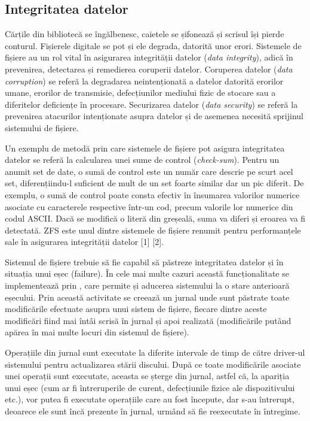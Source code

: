\subsection{Integritatea datelor}
\label{sec:file-system-fs-integrity}

Cărțile din bibliotecă se îngălbenesc, caietele se șifonează și scrisul își
pierde conturul. Fișierele digitale se pot și ele degrada, datorită unor erori.
Sistemele de fișiere au un rol vital în asigurarea integrității datelor
(\textit{data integrity}), adică în prevenirea, detectarea și remedierea
coruperii datelor. Coruperea datelor (\textit{data corruption}) se referă la
degradarea neintenționată a datelor datorită erorilor umane, erorilor de
transmisie, defecțiunilor mediului fizic de stocare sau a diferitelor deficiențe
în procesare. Securizarea datelor (\textit{data security}) se referă la
prevenirea atacurilor intenționate asupra datelor și de asemenea necesită
sprijinul sistemului de fișiere.

Un exemplu de metodă prin care sistemele de fișiere pot asigura integritatea
datelor se referă la calcularea unei sume de control (\textit{check-sum}).
Pentru un anumit set de date, o sumă de control este un număr care descrie pe
scurt acel set, diferențiindu-l suficient de mult de un set foarte similar dar
un pic diferit. De exemplu, o sumă de control poate consta efectiv în însumarea
valorilor numerice asociate cu caracterele respective într-un cod, precum
valorile lor numerice din codul ASCII. Dacă se modifică o literă din greșeală,
suma va diferi și eroarea va fi detectată. ZFS este unul dintre sistemele de
fișiere renumit pentru performanțele sale în asigurarea integrității datelor [1]
[2].

Sistemul de fișiere trebuie să fie capabil să păstreze integritatea datelor și
în situația unui eșec (failure). În cele mai multe cazuri această
funcționalitate se implementează prin , care permite și
aducerea sistemului la o stare anterioară eșecului. Prin această activitate se
creează un jurnal unde sunt păstrate toate modificările efectuate asupra unui
sistem de fișiere, fiecare dintre aceste modificări fiind mai întâi scrisă în
jurnal și apoi realizată (modificările putând apărea în mai multe locuri din
sistemul de fișiere).

Operațiile din jurnal sunt executate la diferite intervale de timp de către
driver-ul sistemului pentru actualizarea stării discului. După ce toate
modificările asociate unei operații sunt executate, aceasta se șterge din
jurnal, astfel că, la apariția unui eșec (cum ar fi întreruperile de curent,
defecțiunile fizice ale dispozitivului etc.), vor putea fi executate operațiile
care au fost începute, dar s-au întrerupt, deoarece ele sunt încă prezente în
jurnal, urmând să fie reexecutate în întregime.

